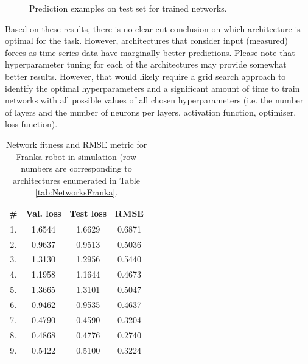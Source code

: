 \begin{figure}
    \hfil
    \caption{Prediction examples on test set for trained networks.}
    \label{fig:Graphs}
\end{figure}

Based on these results, there is no clear-cut conclusion on which architecture is optimal for the task. However, architectures that consider input (measured) forces as time-series data have marginally better predictions. Please note that hyperparameter tuning for each of the architectures may provide somewhat better results. However, that would likely require a grid search approach to identify the optimal hyperparameters and a significant amount of time to train networks with all possible values of all chosen hyperparameters (i.e. the number of layers and the number of neurons per layers, activation function, optimiser, loss function).

\begin{table}
    \caption[Network fitness and RMSE metric for Franka robot (simulation)]{Network fitness and RMSE metric for Franka robot in simulation (row numbers are corresponding to architectures enumerated in Table \ref{tab:NetworksFranka}.}
    \label{tab:ResultsFranka}
    \centering
    \begin{tabular}{|c|c|c|c|}
        \hline
        \textbf{\#} & \textbf{Val. loss} & \textbf{Test loss} & \textbf{RMSE} \\
        \hline
        \hline
        1. & 1.6544 & 1.6629 & 0.6871\\ %
        \hline
        2. & 0.9637 & 0.9513 & 0.5036\\ %
        \hline
        3. & 1.3130 & 1.2956 & 0.5440\\ %
        \hline
        4. & 1.1958 & 1.1644 & 0.4673\\ %
        \hline
        5. & 1.3665 & 1.3101 & 0.5047\\ %
        \hline
        6. & 0.9462 & 0.9535 & 0.4637\\ %
        \hline
        7. & 0.4790 & 0.4590 & 0.3204\\ %
        \hline
        8. & 0.4868 & 0.4776 & 0.2740\\ %
        \hline
        9. & 0.5422 & 0.5100 & 0.3224\\ %
        \hline
    \end{tabular}
\end{table}

